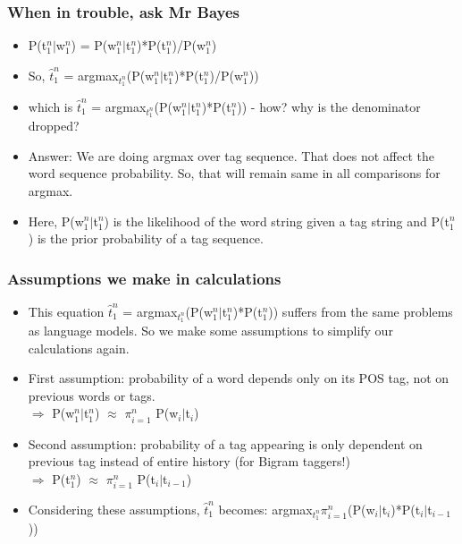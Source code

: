 \documentclass{beamer}
\begin{document}
\begin{frame}
\frametitle{When in trouble, ask Mr Bayes}
\begin{itemize}
\item P(t$_1^n|$w$_1^n$) = P(w$_1^n|$t$_1^n$)*P(t$_1^n$)/P(w$_1^n$)
\item So, $\hat t_1^n$ = argmax$_{t_1^n}$(P(w$_1^n|$t$_1^n$)*P(t$_1^n$)/P(w$_1^n$))
\item which is $\hat t_1^n$ = argmax$_{t_1^n}$(P(w$_1^n|$t$_1^n$)*P(t$_1^n$)) - how? why is the denominator dropped? \pause
\item Answer: We are doing argmax over tag sequence. That does not affect the word sequence probability. So, that will remain same in all comparisons for argmax.
\item Here, P(w$_1^n|$t$_1^n$) is the likelihood of the word string given a tag string and P(t$_1^n$) is the prior probability of a tag sequence.
\end{itemize}
\end{frame}

\begin{frame}
\frametitle{Assumptions we make in calculations}
\begin{itemize}
\item This equation $\hat t_1^n$ = argmax$_{t_1^n}$(P(w$_1^n|$t$_1^n$)*P(t$_1^n$)) suffers from the same problems as language models. So we make some assumptions to simplify our calculations again.
\item First assumption: probability of a word depends only on its POS tag, not on previous words or tags.
\\ $\Rightarrow$ \small{P(w$_1^n|$t$_1^n$)} \normalsize $\approx$ $\pi_{i=1}^n$ \small{P(w$_i|$t$_i$)} \normalsize
\item Second assumption: probability of a tag appearing is only dependent on previous tag instead of entire history (for Bigram taggers!)
\\ $\Rightarrow$ \small{P(t$_1^n$)} \normalsize $\approx$ $\pi_{i=1}^n$ \small{P(t$_i|$t$_{i-1}$)} \normalsize
\item Considering these assumptions, $\hat t_1^n$ becomes: argmax$_{t_1^n} \pi_{i=1}^n$(P(w$_i|$t$_i$)*P(t$_i|$t$_{i-1}$))
\end{itemize}
\end{frame}
\end{document}
